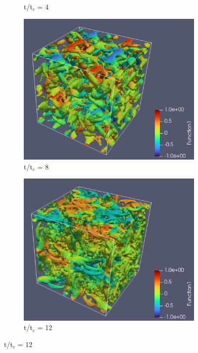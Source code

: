 \documentclass{hcmut-report}
\begin{document}
\begin{figure}[H]
\begin{subfigure}[b]{0.35\textwidth}
         \caption{t/t$_c$ = 4}
         \label{fig:3.2}
     \end{subfigure}
     
     \begin{subfigure}[b]{0.35\textwidth}
         \centering
         \includegraphics[width=\textwidth]{graphics/iso008.png}
         \caption{t/t$_c$ = 8}
         \label{fig:3.1}
     \end{subfigure}
     \hspace{0.5cm}
     \begin{subfigure}[b]{0.35\textwidth}
         \centering
         \includegraphics[width=\textwidth]{graphics/iso012.png}
         \caption{t/t$_c$ = 12}
         \label{fig:3.1}
     \end{subfigure}


\end{figure}
\end{document}
